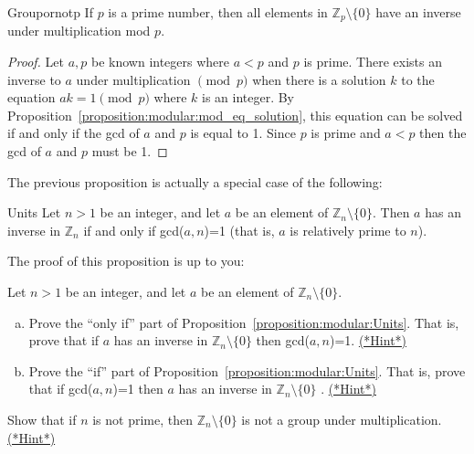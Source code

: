 
\begin{prop}{Groupornotp}
If  $p$ is a prime number, then all elements in $\mathbb{Z}_p \setminus \{0\}$ have an inverse under multiplication mod $p$. 
\end{prop}
\begin{proof}
Let $a,p$ be known integers where $a < p$ and $p$ is prime.  There exists an inverse to $a$ under multiplication $\pmod p$ when there is a solution $k$  to the equation $ak = 1 \pmod p$ where $k$ is an integer.  By Proposition~\ref{proposition:modular:mod_eq_solution}, this equation can be solved if and only if the gcd of $a$ and $p$ is equal to 1.  Since $p$ is prime and $a<p$ then the gcd of $a$ and $p$ must be 1.
\end{proof}

The previous proposition is actually a special case of the following:

\begin{prop}{Units}
Let $n>1$ be an integer, and let  $a$ be an element of  $\mathbb{Z}_n \setminus \{0\}$. Then $a$ has an inverse in $\mathbb{Z}_n$  if and only if gcd($a,n$)=1  (that is, $a$ is relatively prime to $n$).
\end{prop}
The proof of this proposition is up to you:

\begin{exercise}{93}
Let $n>1$ be an integer, and let  $a$ be an element of  $\mathbb{Z}_n \setminus \{0\}$.
\begin{enumerate}[(a)]
\item  Prove  the ``only if'' part  of Proposition~\ref{proposition:modular:Units}. That is, prove that if $a$ has an inverse in $\mathbb{Z}_n \setminus \{0\} $ then gcd($a,n$)=1.
\hyperref[sec:modular_arithmetic:hints]{(*Hint*)}
\item Prove the ``if'' part   of Proposition~\ref{proposition:modular:Units}. That is, prove that if gcd($a,n$)=1 then $a$ has an inverse in $\mathbb{Z}_n \setminus \{0\}$ .
\hyperref[sec:modular_arithmetic:hints]{(*Hint*)}
\end{enumerate}
\end{exercise}

\begin{exercise}{94}
Show that if $n$ is not prime, then $\mathbb{Z}_n\setminus \{0\}$ is not a group under multiplication.
\hyperref[sec:modular_arithmetic:hints]{(*Hint*)}
\end{exercise}

